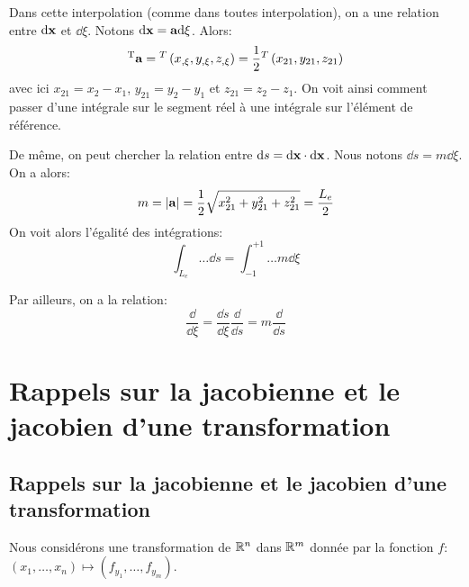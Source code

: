 \medskip\fi
Dans cette interpolation (comme dans toutes interpolation), on a une relation entre $\text{d}\mathbf{x}$ et
$ \dd \xi$. Notons $\text{d}\mathbf{x} = \mathbf{a}  \text{d} \xi$. Alors:
\begin{equation} {}^\mathrm{T}\mathbf{a} = {}^T\left( x_{,\xi}, y_{,\xi}, z_{,\xi}\right) = \frac12 {}^T\left( x_{21}, y_{21}, z_{21}\right)\end{equation}
avec ici $x_{21}=x_2-x_1$, $y_{21}=y_2-y_1$ et $z_{21}=z_2-z_1$.
On voit ainsi comment passer d'une intégrale sur le segment réel à une intégrale
sur l'élément de référence.

\medskip
De même, on peut chercher la relation entre $\text{d} s=\text{d}\mathbf{x}\cdot\text{d}\mathbf{x}$. Nous notons
$\dd s=m  \dd \xi$. On a alors: 
\begin{equation}m=|\mathbf{a}| = \frac12 \sqrt{x_{21}^2+y_{21}^2+z_{21}^2} = \frac{L_e}2 \end{equation}
On voit alors l'égalité des intégrations:
\begin{equation}\int_{L_e} \ldots \dd s = \int_{-1}^{+1}\ldots m \dd \xi\end{equation}

\medskip
Par ailleurs, on a la relation:
\begin{equation} \frac{\dd}{ \dd \xi} = \frac{\dd s}{ \dd \xi}\frac{\dd}{\dd s}=m\frac{\dd}{\dd s}\end{equation}
\medskip
\ifVersionAvecExemplesSepares
   \section{Rappels sur la jacobienne et le jacobien d'une transformation}
\else
   \subsection{Rappels sur la jacobienne et le jacobien d'une transformation}
\fi

Nous considérons une transformation de $\mathbb R^n$ dans $\mathbb R^m$ donnée par la fonction $f$: 
$\left(x_1, \ldots, x_n \right) \mapsto \left(f_{y_1}, \ldots, f_{y_m} \right)$.
\ifVersionDuDocEstVincent

